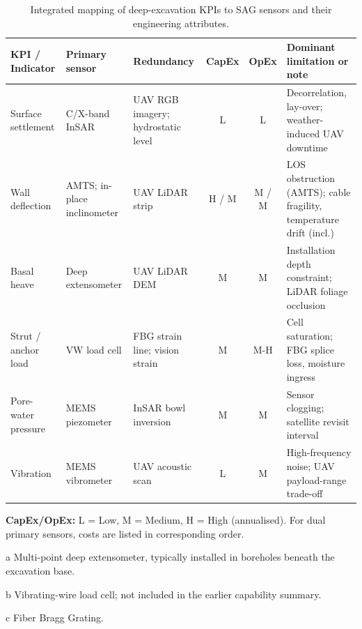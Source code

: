 \documentclass[preprint,11pt,authoryear,3p]{elsarticle}
\begin{document}
\begin{table}[htbp]
\centering\small
\caption{Integrated mapping of deep-excavation KPIs to SAG sensors and their engineering attributes.}
\label{tab:kpi_sensor_matrix}
\begin{threeparttable}
\setlength{\tabcolsep}{3.5pt}
\begin{tabular}{@{}p{3.2cm}p{2.6cm}p{2.9cm}ccp{4.2cm}@{}}
\toprule
\textbf{KPI / Indicator} & \textbf{Primary sensor} & \textbf{Redundancy} & \textbf{CapEx} & \textbf{OpEx} & \textbf{Dominant limitation or note}\\
\midrule
Surface settlement
  & C/X-band InSAR
  & UAV RGB imagery; hydrostatic level
  & L & L
  & Decorrelation, lay-over; weather-induced UAV downtime \\[2pt]

Wall deflection
  & AMTS; in-place inclinometer
  & UAV LiDAR strip
  & H / M & M / M
  & LOS obstruction (AMTS); cable fragility, temperature drift (incl.) \\[2pt]

Basal heave
  & Deep extensometer\tnote{a}
  & UAV LiDAR DEM
  & M & M
  & Installation depth constraint; LiDAR foliage occlusion \\[2pt]

Strut / anchor load
  & VW load cell\tnote{b}
  & FBG \tnote{c} strain line; vision strain
  & M & M-H
  & Cell saturation; FBG splice loss, moisture ingress \\[2pt]

Pore-water pressure
  & MEMS piezometer
  & InSAR bowl inversion
  & M & M
  & Sensor clogging; satellite revisit interval \\[2pt]

Vibration
  & MEMS vibrometer
  & UAV acoustic scan
  & L & M
  & High-frequency noise; UAV payload-range trade-off \\
\bottomrule
\end{tabular}
\begin{tablenotes}\footnotesize
\item \textbf{CapEx/OpEx:} L = Low, M = Medium, H = High (annualised). For dual primary sensors, costs are listed in corresponding order.
\item [a] Multi-point deep extensometer, typically installed in boreholes beneath the excavation base.
\item [b] Vibrating-wire load cell; not included in the earlier capability summary.
\item [c] Fiber Bragg Grating.
\end{tablenotes}
\end{threeparttable}
\end{table}
\end{document}
